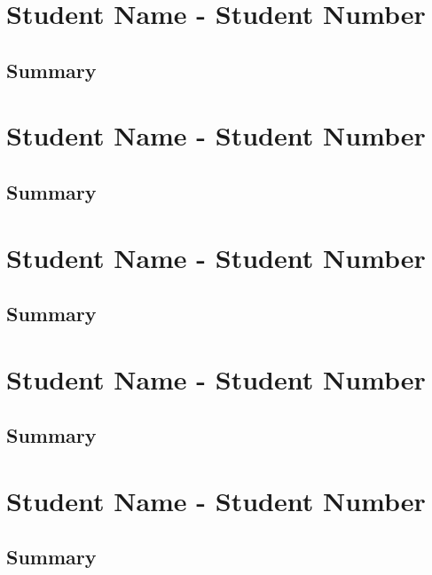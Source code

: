\documentclass[a4paper, 11pt]{report}
\begin{document}
\chapter{Student Name - Student Number}
\section*{Summary}

\chapter{Student Name - Student Number}
\section*{Summary}

\chapter{Student Name - Student Number}
\section*{Summary}

\chapter{Student Name - Student Number}
\section*{Summary}

\chapter{Student Name - Student Number}
\section*{Summary}
\end{document}
